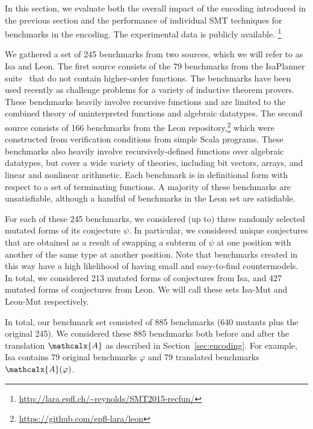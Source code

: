 \documentclass[runningheads,a4paper]{llncs}
\newcommand\isa{Isa\xspace}
\newcommand\isam{Isa-Mut\xspace}
\newcommand\leon{Leon\xspace}
\newcommand\leonm{Leon-Mut\xspace}
\newcommand{\conv}{\mathcalx{A}}
\begin{document}
In this section, we evaluate both the overall impact of the encoding introduced
in the previous section and the performance of individual SMT techniques for
benchmarks in the encoding.
The experimental data is publicly available.%
\footnote{\url{http://lara.epfl.ch/~reynolds/SMT2015-recfun/}}

We gathered a set of 245 benchmarks from two sources, which we will refer to as
\isa and \leon. The first source consists of the 79
benchmarks from the IsaPlanner
suite~\cite{DBLP:conf/itp/JohanssonDB10} that do not contain higher-order
functions. The benchmarks have been used recently as challenge problems for a
variety of inductive theorem provers. These benchmarks heavily involve
recursive functions and are limited to the combined theory of uninterpreted
functions and algebraic datatypes. The second source consists of 166
benchmarks from the Leon repository,\footnote{%
\url{https://github.com/epfl-lara/leon}} which were constructed from
verification conditions from simple Scala programs. These benchmarks also
heavily involve recursively-defined functions over algebraic datatypes, 
but cover a wide variety of theories, including bit vectors, arrays, and linear and
nonlinear arithmetic. Each benchmark is in definitional form with respect to a
set of terminating functions.
%
A majority of these benchmarks are unsatisfiable, although a
handful of benchmarks in the \leon set are satisfiable.

For each of these 245 benchmarks, we considered (up to) three randomly selected
mutated forms of its conjecture $\psi$. In particular, we considered unique
conjectures that are obtained as a result of swapping a subterm of $\psi$ at
one position with another of the same type at another position.
Note that benchmarks created in this way have a high likelihood of having small
and easy-to-find countermodels. In total, we considered 213 mutated forms of
conjectures from \isa, and 427 mutated forms of conjectures from \leon. We will
call these sets \isam and \leonm respectively.

In total, our benchmark set consisted of 885 benchmarks (640 mutants plus the
original 245). We considered these 885 benchmarks both before and after the
translation $\conv$ as described in Section~\ref{sec:encoding}. For example,
\isa contains 79 original benchmarks $\varphi$ and 79 translated benchmarks
$\conv(\varphi)$.
\end{document}
